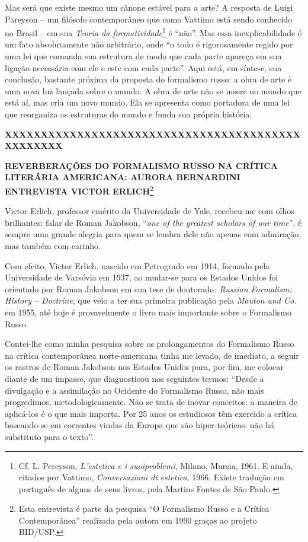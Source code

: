 Mas será que existe mesmo um cânone estável para a arte? A resposta de
Luigi Pareyson -- um filósofo contemporâneo que como Vattimo está sendo
conhecido no Brasil -- em sua \emph{Teoria da formatividade}\footnote{Cf.
  L. Pereyson, \emph{L'estetica e i suoiproblemi}, Milano, Mursia, 1961.
  E ainda, citados por Vattimo, \emph{Conversazioni di estetica}, 1966.
  Existe tradução em português de alguns de seus livros, pela Martins
  Fontes de São Paulo.} é ``não''. Mas essa inexplicabilidade é um fato
absolutamente não arbitrário, onde ``o todo é rigorosamente regido por
uma lei que comanda sua estrutura de modo que cada parte apareça em sua
ligação necessária com ele e este com cada parte''. Aqui está, em
síntese, sua conclusão, bastante próxima da proposta do formalismo
russo: a obra de arte é uma nova luz lançada sobre o mundo. A obra de
arte não se insere no mundo que está aí, mas cria um novo mundo. Ela se
apresenta como portadora de uma lei que reorganiza as estruturas do
mundo e funda sua própria história.

\textbf{XXXXXXXXXXXXXXXXXXXXXXXXXXXXXXXXXXXXXXXXXXXXXXXXX}

\textbf{REVERBERAÇÕES DO FORMALISMO RUSSO NA CRÍTICA LITERÁRIA
AMERICANA: AURORA BERNARDINI ENTREVISTA VICTOR ERLICH}\footnote{Esta
  entrevista é parte da pesquisa ``O Formalismo Russo e a Crítica
  Contemporânea'' realizada pela autora em 1990 graças ao projeto
  BID/USP.}

Victor Erlich, professor emérito da Universidade de Yale, recebeu-me com
olhos brilhantes: falar de Roman Jakobson, ``\emph{one of the greatest
scholars of our time}'', é sempre uma grande alegria para quem se lembra
dele não apenas com admiração, mas também com carinho.

Com efeito, Victor Erlich, nascido em Petrogrado em 1914, formado pela
Universidade de Varsóvia em 1937, ao mudar-se para os Estados Unidos foi
orientado por Roman Jakobson em sua tese de doutorado\emph{: Russian
Formalism: History -- Doctrine}, que veio a ter sua primeira publicação
pela \emph{Mouton and Co.} em 1955, até hoje é provavelmente o livro
mais importante sobre o Formalismo Russo.

Contei-lhe como minha pesquisa sobre os prolongamentos do Formalismo
Russo na crítica contemporânea norte-americana tinha me levado, de
imediato, a seguir os rastros de Roman Jakobson nos Estados Unidos para,
por fim, me colocar diante de um impasse, que diagnosticou nos seguintes
termos: ``Desde a divulgação e a assimilação no Ocidente do Formalismo
Russo, não mais progredimos, metodologicamente. Não se trata de inovar
conceitos: a maneira de aplicá-los é o que mais importa. Por 25 anos os
estudiosos têm exercido a crítica baseando-se em correntes vindas da
Europa que são hiper-teóricas: não há substituto para o texto''.


